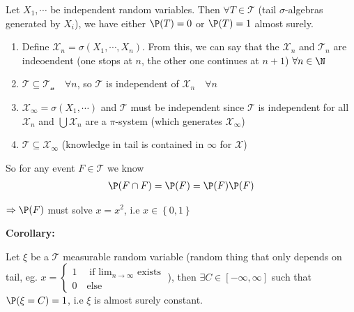 \begin{theo}{}
  Let $X_1,\cdots$ be independent random variables. Then $\forall T\in\mathcal{T}$ (tail $\sigma$-algebras generated by $X_i$), we have either $\P(T) = 0$ or $\P(T) = 1$ almost surely.
\end{theo}
\par\bigskip
\begin{prf}{}
  \begin{enumerate}[leftmargin=*]
    \item Define $\mathcal{X}_n = \sigma(X_1,\cdots, X_n)$. From this, we can say that the $\mathcal{X}_n$ and $\mathcal{T}_n$ are indeoendent (one stops at $n$, the other one continues at $n+1$) $\forall n\in\N$
    \item $\mathcal{T}\subseteq\mathcal{T_n}\quad\forall n$, so $\mathcal{T}$ is independent of $\mathcal{X}_n\quad\forall n$ 
    \item $\mathcal{X}_\infty = \sigma(X_1,\cdots)$ and $\mathcal{T}$ must be independent since $\mathcal{T}$ is independent for all $\mathcal{X}_n$ and $\bigcup \mathcal{X}_n$ are a $\pi$-system (which generates $\mathcal{X}_\infty$)
    \item $\mathcal{T}\subseteq\mathcal{X}_\infty$ (knowledge in tail is contained in $\infty$ for $\mathcal{X}$)
  \end{enumerate}
  \par\bigskip
  \noindent So for any event $F\in\mathcal{T}$ we know
  \begin{equation*}
    \begin{gathered}
      \P(F\cap F) = \P(F) = \P(F)\P(F)\\
    \end{gathered}
  \end{equation*}\par
  \noindent$\Rightarrow\P(F)$ must solve $x = x^2$, i.e $x\in \left\{0,1\right\}$
\end{prf}
\par\bigskip
\noindent\textbf{Corollary:}\par
\noindent Let $\xi$ be a $\mathcal{T}$ measurable random variable (random thing that only depends on tail, eg. $x=\begin{cases}1\quad\text{if $\lim_{n\to\infty}$ exists}\\0\quad\text{else}\end{cases}$), then $\exists C\in[-\infty,\infty]$ such that $\P(\xi=C) = 1$, i.e $\xi$ is almost surely constant.
